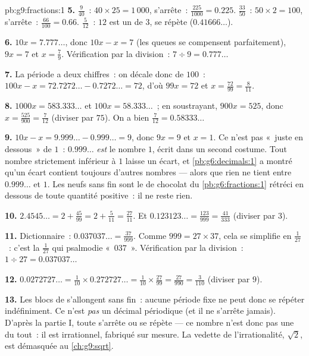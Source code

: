 \begin{solution}{pb:g9:fractions:1}
\textbf{5.} $\frac{9}{40}$~: $40 \times 25 = 1\,000$, s'arrête~:
$\frac{225}{1000} = 0.225$. $\frac{33}{50}$~:
$50 \times 2 = 100$, s'arrête~: $\frac{66}{100} = 0.66$.
$\frac{5}{12}$~: $12$ est un  de $3$, se répète
($0.41666\ldots$).

\textbf{6.} $10x = 7.777\ldots$, donc $10x - x = 7$ (les queues se
compensent parfaitement), $9x = 7$ et $x = \frac79$. Vérification
par la division~: $7 \div 9 = 0.777\ldots$

\textbf{7.} La période a deux chiffres~: on décale donc de $100$~:
$100x - x = 72.7272\ldots - 0.7272\ldots = 72$, d'où
$99x = 72$ et $x = \frac{72}{99} = \frac{8}{11}$.

\textbf{8.} $1000x = 583.333\ldots$ et $100x = 58.333\ldots$~; en
soustrayant, $900x = 525$, donc
$x = \frac{525}{900} = \frac{7}{12}$ (diviser par $75$). On a bien
$\frac{7}{12} = 0.58333\ldots$

\textbf{9.} $10x - x = 9.999\ldots - 0.999\ldots = 9$, donc
$9x = 9$ et $x = 1$. Ce n'est pas «~juste en dessous~» de $1$~:
$0.999\ldots$ \emph{est} le nombre $1$, écrit dans un second
costume. Tout nombre strictement inférieur à $1$ laisse un écart, et
\cref{pb:g6:decimals:1} a montré qu'un écart contient toujours
d'autres nombres --- alors que rien ne tient entre $0.999\ldots$ et
$1$. Les neufs sans fin sont le  de chocolat du
\cref{pb:g6:fractions:1} rétréci en dessous de toute quantité
positive~: il ne reste rien.

\textbf{10.} $2.4545\ldots = 2 + \frac{45}{99} = 2 +
\frac{5}{11} = \frac{27}{11}$. Et
$0.123123\ldots = \frac{123}{999} = \frac{41}{333}$ (diviser par
$3$).

\textbf{11.} Dictionnaire~: $0.037037\ldots = \frac{37}{999}$.
Comme $999 = 27 \times 37$, cela se simplifie en $\frac{1}{27}$~:
c'est la  $\frac{1}{27}$ qui psalmodie «~$037$~».
Vérification par la division~: $1 \div 27 = 0.037037\ldots$

\textbf{12.} $0.0272727\ldots = \frac{1}{10} \times
0.272727\ldots = \frac{1}{10} \times \frac{27}{99}
= \frac{27}{990} = \frac{3}{110}$ (diviser par $9$).

\textbf{13.} Les blocs de  s'allongent sans fin~: aucune
période fixe ne peut donc se répéter indéfiniment. Ce n'est
\emph{pas} un décimal périodique (et il ne s'arrête jamais).
D'après la partie I, toute  s'arrête ou se répète --- ce
nombre n'est donc pas une  du tout~: il est irrationnel,
fabriqué sur mesure. La vedette de l'irrationalité, $\sqrt2$, est
démasquée au \cref{ch:g9:sqrt}.


\end{solution}
